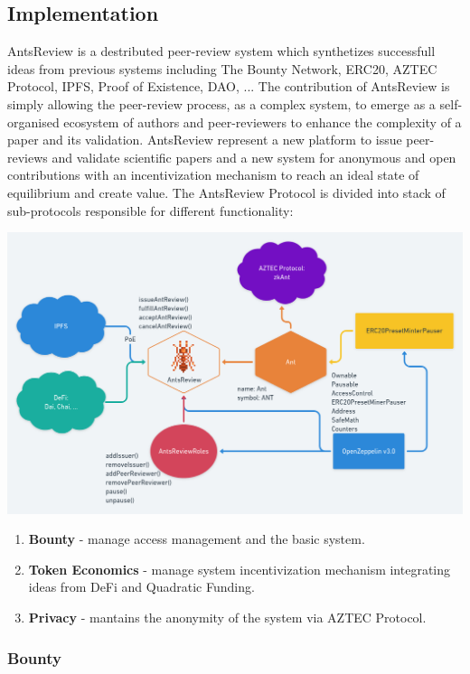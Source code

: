 \documentclass[runningheads]{llncs}
\begin{document}
\subsection{Implementation}
AntsReview is a destributed peer-review system which synthetizes successfull ideas from previous systems including The Bounty Network, ERC20, AZTEC Protocol, IPFS, Proof of Existence, DAO, ...
\newline The contribution of AntsReview is simply allowing the peer-review process, as a complex system, to emerge as a self-organised ecosystem of authors and peer-reviewers to enhance the complexity of a paper and its validation.
\newline AntsReview represent a new platform to issue peer-reviews and validate scientific papers and a new system for anonymous and open contributions with an incentivization mechanism to reach an ideal state of equilibrium and create value.
\newline The AntsReview Protocol is divided into stack of sub-protocols responsible for different functionality:

\includegraphics[scale=0.28]{AntsReview}

\begin{enumerate}
  \item \textbf{Bounty} - manage access management and the basic system.
  \item \textbf{Token Economics} - manage system incentivization mechanism integrating ideas from DeFi and Quadratic Funding.
  \item \textbf{Privacy} - mantains the anonymity of the system via AZTEC Protocol.
\end{enumerate}

\subsubsection{Bounty}
\end{document}
